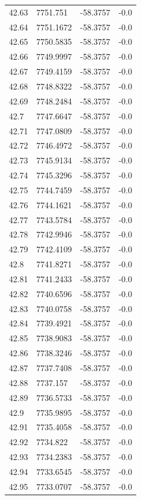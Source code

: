 \begin{table}[H]
\begin{tabular}{llll}
42.63 & 7751.751 & -58.3757 & -0.0 \\
42.64 & 7751.1672 & -58.3757 & -0.0 \\
42.65 & 7750.5835 & -58.3757 & -0.0 \\
42.66 & 7749.9997 & -58.3757 & -0.0 \\
42.67 & 7749.4159 & -58.3757 & -0.0 \\
42.68 & 7748.8322 & -58.3757 & -0.0 \\
42.69 & 7748.2484 & -58.3757 & -0.0 \\
42.7 & 7747.6647 & -58.3757 & -0.0 \\
42.71 & 7747.0809 & -58.3757 & -0.0 \\
42.72 & 7746.4972 & -58.3757 & -0.0 \\
42.73 & 7745.9134 & -58.3757 & -0.0 \\
42.74 & 7745.3296 & -58.3757 & -0.0 \\
42.75 & 7744.7459 & -58.3757 & -0.0 \\
42.76 & 7744.1621 & -58.3757 & -0.0 \\
42.77 & 7743.5784 & -58.3757 & -0.0 \\
42.78 & 7742.9946 & -58.3757 & -0.0 \\
42.79 & 7742.4109 & -58.3757 & -0.0 \\
42.8 & 7741.8271 & -58.3757 & -0.0 \\
42.81 & 7741.2433 & -58.3757 & -0.0 \\
42.82 & 7740.6596 & -58.3757 & -0.0 \\
42.83 & 7740.0758 & -58.3757 & -0.0 \\
42.84 & 7739.4921 & -58.3757 & -0.0 \\
42.85 & 7738.9083 & -58.3757 & -0.0 \\
42.86 & 7738.3246 & -58.3757 & -0.0 \\
42.87 & 7737.7408 & -58.3757 & -0.0 \\
42.88 & 7737.157 & -58.3757 & -0.0 \\
42.89 & 7736.5733 & -58.3757 & -0.0 \\
42.9 & 7735.9895 & -58.3757 & -0.0 \\
42.91 & 7735.4058 & -58.3757 & -0.0 \\
42.92 & 7734.822 & -58.3757 & -0.0 \\
42.93 & 7734.2383 & -58.3757 & -0.0 \\
42.94 & 7733.6545 & -58.3757 & -0.0 \\
42.95 & 7733.0707 & -58.3757 & -0.0 \\

\end{tabular}
\end{table}

